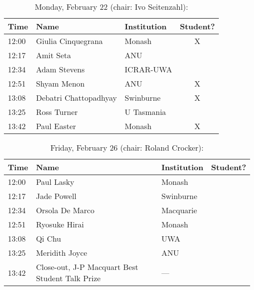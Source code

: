 \documentclass[amsmath,onecolumn]{revtex4-1}
\begin{document}
\begin{table}[!htbp]
	\centering
	\caption{Monday, February 22 (chair: Ivo Seitenzahl):}
\begin{tabular}{| l | l | l | c |}
	\hline
	Time & Name  & Institution & Student? \\ 		
	\hline
	12:00 & Giulia	Cinquegrana & Monash & X\\
	12:17 & Amit 	Seta & ANU  & \\
	12:34 & Adam	Stevens & ICRAR-UWA &\\
	12:51 & Shyam	Menon & ANU & X\\
	13:08 & Debatri 	Chattopadhyay & Swinburne  & X \\
	13:25 & Ross	Turner  & U Tasmania  & \\
	13:42 & Paul	Easter & Monash & X\\
	\hline
\end{tabular}
\end{table}

\begin{table}[!htbp]
	\centering
	\caption{Friday, February 26 (chair: Roland Crocker):}
\begin{tabular}{| l | l | l | c |}
	\hline
	Time & Name  & Institution & Student? \\ 		
	\hline
	12:00 & Paul	Lasky & Monash & \\
	12:17 & Jade	Powell & Swinburne & \\
	12:34 & Orsola	De Marco & Macquarie & \\
	12:51 & Ryosuke	Hirai  & Monash & \\
	13:08 & Qi	Chu & UWA & \\
	13:25 & Meridith	Joyce & ANU  & \\
	13:42 & Close-out, J-P Macquart Best Student Talk Prize & --- & \\
	\hline
\end{tabular}
\end{table}
\end{document}
